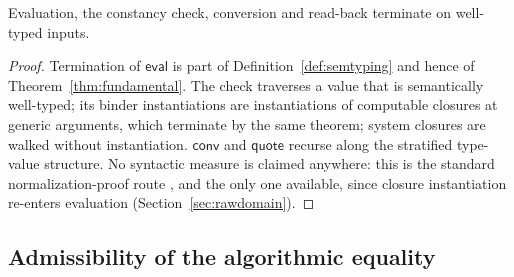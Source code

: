 \documentclass{lmcs}
\newcommand{\evalop}{\mathsf{eval}}
\newcommand{\convop}{\mathsf{conv}}
\newcommand{\quo}{\mathsf{quote}}
\begin{document}
\begin{cor}
  \label{cor:termination}
  Evaluation, the constancy check, conversion and read-back
  terminate on well-typed inputs.
\end{cor}
\begin{proof}
  Termination of $\evalop$ is part of
  Definition~\ref{def:semtyping} and hence of
  Theorem~\ref{thm:fundamental}.  The check traverses a value that is
  semantically well-typed; its binder instantiations are
  instantiations of computable closures at generic arguments, which
  terminate by the same theorem; system closures are walked without
  instantiation.  $\convop$ and $\quo$ recurse along the stratified
  type-value structure.  No syntactic measure is claimed anywhere:
  this is the standard normalization-proof route
  \cite{HuberNorm,SterlingAngiuli}, and the only one available, since
  closure instantiation re-enters evaluation
  (Section~\ref{sec:rawdomain}).
\end{proof}

\subsection{Admissibility of the algorithmic equality}
\end{document}
